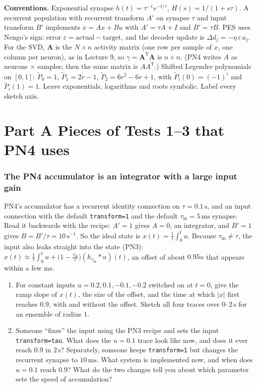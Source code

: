 \documentclass[11pt,letterpaper]{article}
\newcommand{\T}{\mathsf{T}}
\newcommand{\tin}{\tau_{\mathrm{in}}}
\begin{document}
\textbf{Conventions.} Exponential synapse $h(t) = \tau^{-1}e^{-t/\tau}$, $H(s) = 1/(1 + s\tau)$. A recurrent population with recurrent transform $A'$ on synapse $\tau$ and input transform $B'$ implements $\dot x = Ax + Bu$ with $A' = \tau A + I$ and $B' = \tau B$. PES uses Nengo's sign: error $\varepsilon = \text{actual} - \text{target}$, and the decoder update is $\Delta d_j = -\eta\,\varepsilon\,a_j$. For the SVD, $\mathbf A$ is the $N \times n$ activity matrix (one row per sample of $x$, one column per neuron), as in Lecture 9, so $\gamma = \mathbf A^\T\mathbf A$ is $n \times n$. (PN4 writes $A$ as neurons $\times$ samples; then the same matrix is $AA^\T$.) Shifted Legendre polynomials on $[0, 1]$: $\tilde P_0 = 1$, $\tilde P_1 = 2r - 1$, $\tilde P_2 = 6r^2 - 6r + 1$, with $\tilde P_i(0) = (-1)^i$ and $\tilde P_i(1) = 1$. Leave exponentials, logarithms and roots symbolic. Label every sketch axis.

\part*{Part A \quad Pieces of Tests 1--3 that PN4 uses}

\section{The PN4 accumulator is an integrator with a large input gain}

\begin{idea}
PN4's accumulator has a recurrent identity connection on $\tau = 0.1\,\mathrm{s}$, and an input connection with the default \texttt{transform=1} and the default $\tin = 5\,\mathrm{ms}$ synapse. Read it backwards with the recipe: $A' = 1$ gives $A = 0$, an integrator, and $B' = 1$ gives $B = B'/\tau = 10\,\mathrm{s^{-1}}$. So the ideal state is $x(t) = \frac{1}{\tau}\int_0^t u$. Because $\tin \ne \tau$, the input also leaks straight into the state (PN3): $x(t) \approx \frac1\tau\int_0^t u + \bigl(1 - \frac{\tin}{\tau}\bigr)(h_{\tin} * u)(t)$, an offset of about $0.95u$ that appears within a few ms.
\end{idea}

\begin{enumerate}
\item For constant inputs $u = 0.2, 0.1, -0.1, -0.2$ switched on at $t = 0$, give the ramp slope of $x(t)$, the size of the offset, and the time at which $|x|$ first reaches $0.9$, with and without the offset. Sketch all four traces over $0$--$2\,\mathrm{s}$ for an ensemble of radius $1$.
\item Someone ``fixes'' the input using the PN3 recipe and sets the input \texttt{transform=tau}. What does the $u = 0.1$ trace look like now, and does it ever reach $0.9$ in $2\,\mathrm{s}$? Separately, someone keeps \texttt{transform=1} but changes the recurrent synapse to $10\,\mathrm{ms}$. What system is implemented now, and when does $u = 0.1$ reach $0.9$? What do the two changes tell you about which parameter sets the speed of accumulation?
\end{enumerate}
\end{document}
